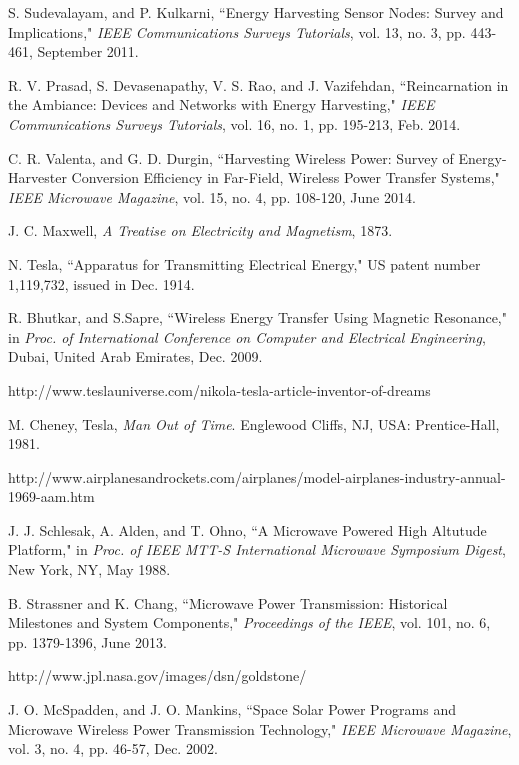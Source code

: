 \documentclass[twocolumn,10pt]{IEEEtran}
\begin{document}
\begin{thebibliography}{99}
S. Sudevalayam, and P. Kulkarni, ``Energy Harvesting Sensor Nodes: Survey and Implications,"
\emph{IEEE Communications Surveys  Tutorials}, vol. 13, no. 3, pp.  443-461, September  2011.

R. V. Prasad, S. Devasenapathy, V. S. Rao, and J. Vazifehdan,  ``Reincarnation in the Ambiance: Devices and Networks with Energy Harvesting," \emph{IEEE Communications Surveys  Tutorials}, vol. 16, no. 1, pp. 195-213, Feb. 2014.

C. R. Valenta, and G. D. Durgin, ``Harvesting Wireless Power: Survey of Energy-Harvester Conversion Efficiency in Far-Field, Wireless Power Transfer Systems," \emph{IEEE Microwave Magazine}, vol. 15, no. 4, pp. 108-120, June 2014.

J. C. Maxwell, \emph{A Treatise on Electricity and Magnetism}, 1873.

N. Tesla, ``Apparatus for Transmitting Electrical Energy," US patent number 1,119,732, issued in Dec. 1914.

R. Bhutkar, and S.Sapre, ``Wireless Energy Transfer Using Magnetic Resonance," in \emph{Proc. of International Conference on Computer and Electrical Engineering}, Dubai, United Arab Emirates, Dec. 2009. 

http://www.teslauniverse.com/nikola-tesla-article-inventor-of-dreams

M. Cheney, Tesla, {\em Man Out of Time}. Englewood Cliffs, NJ, USA: Prentice-Hall, 1981.

http://www.airplanesandrockets.com/airplanes/model-airplanes-industry-annual-1969-aam.htm


J. J. Schlesak, A. Alden, and  T. Ohno, ``A Microwave Powered High Altutude Platform," in \emph{Proc. of IEEE MTT-S International Microwave Symposium Digest}, New York, NY, May 1988.  

B. Strassner and K. Chang, ``Microwave Power Transmission: Historical Milestones and System Components,"
\emph{Proceedings of the IEEE}, vol. 101, no. 6, pp. 1379-1396, June  2013.

http://www.jpl.nasa.gov/images/dsn/goldstone/


J. O. McSpadden, and J. O. Mankins, 
``Space Solar Power Programs and Microwave Wireless Power Transmission Technology," \emph{IEEE Microwave Magazine}, vol. 3, no. 4, pp. 46-57, Dec. 2002.


\end{thebibliography}
\end{document}
